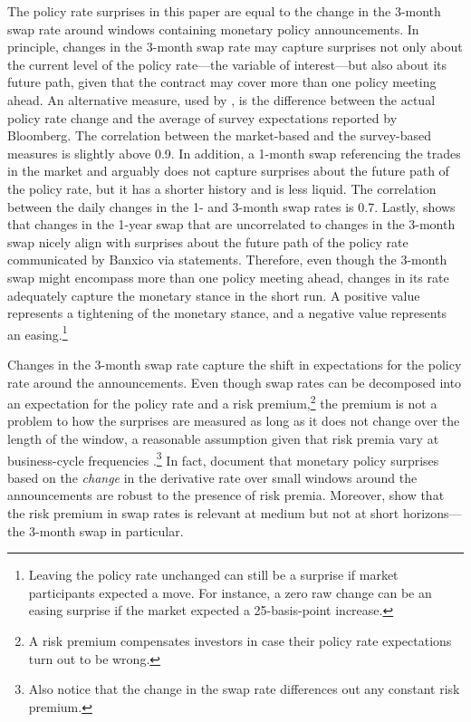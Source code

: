 The policy rate surprises in this paper are equal to the change in the 3-month swap rate around windows containing monetary policy announcements. In principle, changes in the 3-month swap rate may capture surprises not only about the current level of the policy rate---the variable of interest---but also about its future path, given that the contract may cover more than one policy meeting ahead. An alternative measure, used by \textcite{DePooter_etal:2014}, is the difference between the actual policy rate change and the average of survey expectations reported by Bloomberg. The correlation between the market-based and the survey-based measures is slightly above 0.9. In addition, a 1-month swap referencing the \tiie{} trades in the market and arguably does not capture surprises about the future path of the policy rate, but it has a shorter history and is less liquid. The correlation between the daily changes in the 1- and 3-month swap rates is 0.7. Lastly, \textcite{Solis:2F} shows that changes in the 1-year swap that are uncorrelated to changes in the 3-month swap nicely align with surprises about the future path of the policy rate communicated by Banxico via statements. Therefore, even though the 3-month swap might encompass more than one policy meeting ahead, changes in its rate adequately capture the monetary stance in the short run. A positive value represents a tightening of the monetary stance, and a negative value represents an easing.\footnote{Leaving the policy rate unchanged can still be a surprise if market participants expected a move. For instance, a zero raw change can be an easing surprise if the market expected a 25-basis-point increase.} 

Changes in the 3-month swap rate capture the shift in expectations for the policy rate around the announcements. Even though swap rates can be decomposed into an expectation for the policy rate and a risk premium,\footnote{A risk premium compensates investors in case their policy rate expectations turn out to be wrong.} the premium is not a problem to how the surprises are measured as long as it does not change over the length of the window, a reasonable assumption given that risk premia vary at business-cycle frequencies \parencite{PiazzesiSwanson:2008, GVRFSM:2019}.\footnote{ Also notice that the change in the swap rate differences out any constant risk premium.} In fact, \textcite{PiazzesiSwanson:2008} document that monetary policy surprises based on the \textit{change} in the derivative rate over small windows around the announcements are robust to the presence of risk premia. Moreover, \textcite{GVRFSM:2019} show that the risk premium in \tiie{} swap rates is relevant at medium but not at short horizons---the 3-month swap in particular.

